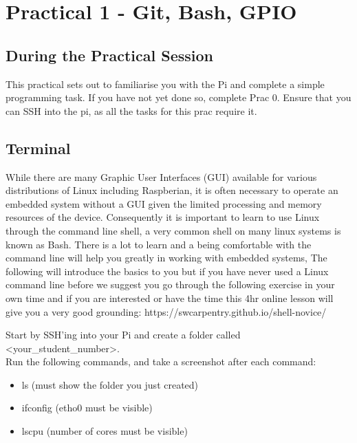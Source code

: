 \section{Practical 1 - Git, Bash, GPIO}

\subsection{During the Practical Session}
This practical sets out to familiarise you with the Pi and complete a simple programming task. If you have not yet done so, complete Prac 0. Ensure that you can SSH into the pi, as all the tasks for this prac require it.


\subsection{Terminal}
\label{sec:Prac1:Terminal}
While there are many Graphic User Interfaces (GUI) available for various distributions of Linux including Raspberian, it is often necessary to operate an embedded system without a GUI given the limited processing and memory resources of the device.  Consequently it is important to learn to use Linux through the command line shell, a very common shell on many linux systems is known as Bash.  There is a lot to learn and a being comfortable with the command line will help you greatly in working with embedded systems,  The following will introduce the basics to you but if you have never used a Linux command line before we suggest you go through the following exercise in your own time  and if you are interested or have the time this 4hr online lesson will give you a very good grounding: https://swcarpentry.github.io/shell-novice/

Start by SSH'ing into your Pi and create a folder called \textless your\_student\_number\textgreater.\\
Run the following commands, and take a screenshot after each command:
\begin{itemize}
    \item ls (must show the folder you just created)
    \item ifconfig (etho0 must be visible)
    \item lscpu (number of cores must be visible)
\end{itemize}

